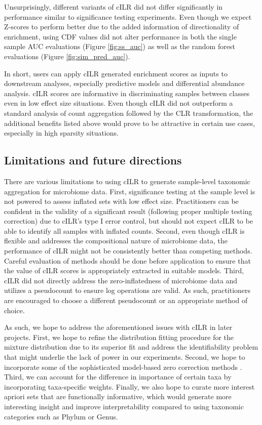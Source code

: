 \documentclass[10pt,letterpaper]{article}
\begin{document}
Unsurprisingly, different variants of cILR did not differ significantly in performance similar to significance testing experiments. Even though we expect Z-scores to perform better due to the added information of directionality of enrichment, using CDF values did not alter performance in both the single sample AUC evaluations (Figure \ref{fig:ss_auc}) as well as the random forest evaluations (Figure \ref{fig:sim_pred_auc}). 

In short, users can apply cILR generated enrichment scores as inputs to downstream analyses, especially predictive models and differential abundance analysis. cILR scores are informative in discriminating samples between classes even in low effect size situations. Even though cILR did not outperform a standard analysis of count aggregation followed by the CLR transformation, the additional benefits listed above would prove to be attractive in certain use cases, especially in high sparsity situations. 

\subsection*{Limitations and future directions}
There are various limitations to using cILR to generate sample-level taxonomic aggregation for microbiome data. First, significance testing at the sample level is not powered to assess inflated sets with low effect size. Practitioners can be confident in the validity of a significant result (following proper multiple testing correction) due to cILR's type I error control, but should not expect cILR to be able to identify all samples with inflated counts. Second, even though cILR is flexible and addresses the compositional nature of microbiome data, the performance of cILR might not be consistently better than competing methods. Careful evaluation of methods should be done before application to ensure that the value of cILR scores is appropriately extracted in suitable models. Third, cILR did not directly address the zero-inflatedness of microbiome data and utilizes a pseudocount to ensure log operations are valid. As such, practitioners are encouraged to choose a different pseudocount or an appropriate method of choice.   

As such, we hope to address the aforementioned issues with cILR in later projects. First, we hope to refine the distribution fitting procedure for the mixture distribution due to its superior fit and address the identifiability problem that might underlie the lack of power in our experiments. Second, we hope to incorporate some of the sophisticated model-based zero correction methods \cite{martin-fernandez2012,kaul2017a}. Third, we can account for the difference in importance of certain taxa by incorporating taxa-specific weights. Finally, we also hope to curate more interest apriori sets that are functionally informative, which would generate more interesting insight and improve interpretability compared to using taxonomic categories such as Phylum or Genus. 
\end{document}
